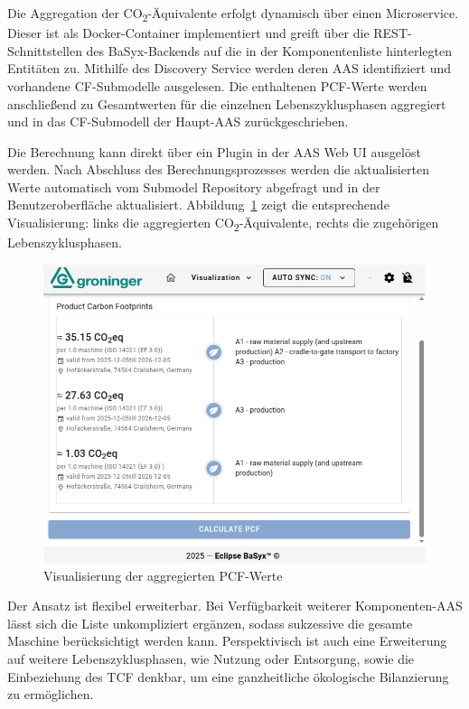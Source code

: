 Die Aggregation der CO\textsubscript{2}-Äquivalente erfolgt dynamisch über einen Microservice. 
Dieser ist als Docker-Container implementiert und greift über die REST-Schnittstellen des BaSyx-Backends auf die in der Komponentenliste hinterlegten Entitäten zu. 
Mithilfe des Discovery Service werden deren AAS identifiziert und vorhandene CF-Submodelle ausgelesen. 
Die enthaltenen PCF-Werte werden anschließend zu Gesamtwerten für die einzelnen Lebenszyklusphasen aggregiert und in das CF-Submodell der Haupt-AAS zurückgeschrieben.

Die Berechnung kann direkt über ein Plugin in der AAS Web UI ausgelöst werden.
 Nach Abschluss des Berechnungsprozesses werden die aktualisierten Werte automatisch vom Submodel Repository abgefragt und in der Benutzeroberfläche aktualisiert.
Abbildung~\ref{fig:PluginAggregation} zeigt die entsprechende Visualisierung: links die aggregierten CO\textsubscript{2}-Äquivalente, rechts die zugehörigen Lebenszyklusphasen.

\begin{figure}[htbp]
    \centering
        \includegraphics[width=1\textwidth]{Bilder/Ergebnisse/DPP/PluginTest.png}
    \caption{Visualisierung der aggregierten PCF-Werte}
    \label{fig:PluginAggregation}
\end{figure}

Der Ansatz ist flexibel erweiterbar.
Bei Verfügbarkeit weiterer Komponenten-AAS lässt sich die Liste unkompliziert ergänzen, sodass sukzessive die gesamte Maschine berücksichtigt werden kann. 
Perspektivisch ist auch eine Erweiterung auf weitere Lebenszyklusphasen, wie Nutzung oder Entsorgung, sowie die Einbeziehung des TCF denkbar, um eine ganzheitliche ökologische Bilanzierung zu ermöglichen.

